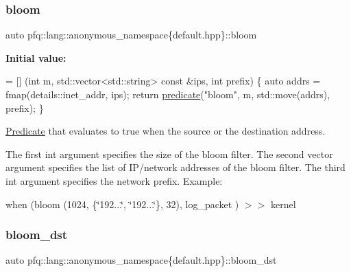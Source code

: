 \subsubsection{\texorpdfstring{bloom}{bloom}}
{\footnotesize\ttfamily auto pfq\+::lang\+::anonymous\+\_\+namespace\{default.\+hpp\}\+::bloom}

{\bfseries Initial value\+:}
\begin{DoxyCode}
= [] (\textcolor{keywordtype}{int} m, std::vector<std::string> \textcolor{keyword}{const} &ips, \textcolor{keywordtype}{int} prefix) \{
                                \textcolor{keyword}{auto} addrs = fmap(details::inet\_addr, ips);
                                \textcolor{keywordflow}{return} \hyperlink{namespacepfq_1_1lang_aca9adafc436b7f851621b979fa1aaf88}{predicate}(\textcolor{stringliteral}{"bloom"}, m, std::move(addrs), prefix);
                          \}
\end{DoxyCode}


\hyperlink{structpfq_1_1lang_1_1Predicate}{Predicate} that evaluates to {\ttfamily true} when the source or the destination address. 

The first {\ttfamily int} argument specifies the size of the bloom filter. The second {\ttfamily vector} argument specifies the list of I\+P/network addresses of the bloom filter. The third {\ttfamily int} argument specifies the network prefix. Example\+:

when (bloom (1024, \{\char`\"{}192...\char`\"{}, \char`\"{}192...\char`\"{}\}, 32), log\+\_\+packet ) $>$$>$ kernel \mbox{\label{namespacepfq_1_1lang_1_1anonymous__namespace_02default_8hpp_03_ac1c667000a13acfbda8490d5748b91c4}} 
\subsubsection{\texorpdfstring{bloom\+\_\+dst}{bloom\_dst}}
{\footnotesize\ttfamily auto pfq\+::lang\+::anonymous\+\_\+namespace\{default.\+hpp\}\+::bloom\+\_\+dst}

